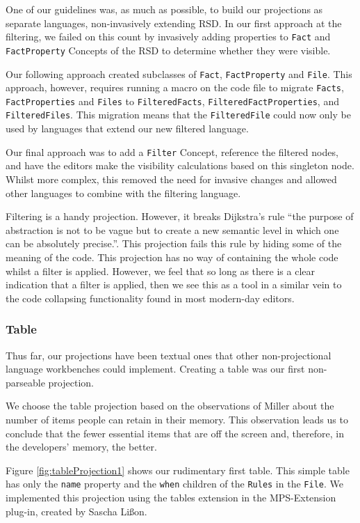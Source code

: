 One of our guidelines was, as much as possible, to build our projections as separate languages, non-invasively extending RSD.
In our first approach at the filtering, we failed on this count by invasively adding properties to \texttt{Fact} and \texttt{FactProperty} Concepts of the RSD to determine whether they were visible.

Our following approach created subclasses of \texttt{Fact}, \texttt{FactProperty} and \texttt{File}.
This approach, however, requires running a macro on the code file to migrate \texttt{Facts}, \texttt{FactProperties} and \texttt{Files} to \texttt{FilteredFacts}, \texttt{FilteredFactProperties}, and \texttt{FilteredFiles}.
This migration means that the \texttt{FilteredFile} could now only be used by languages that extend our new filtered language.

Our final approach was to add a \texttt{Filter} Concept, reference the filtered nodes, and have the editors make the visibility calculations based on this singleton node.
Whilst more complex, this removed the need for invasive changes and allowed other languages to combine with the filtering language.

Filtering is a handy projection.
However, it breaks Dijkstra's rule ``the purpose of abstraction is not to be vague but to create a new semantic level in which one can be absolutely precise.''\cite{dijkstra1972humble}.
This projection fails this rule by hiding some of the meaning of the code.
This projection has no way of containing the whole code whilst a filter is applied.
However, we feel that so long as there is a clear indication that a filter is applied, then we see this as a tool in a similar vein to the code collapsing functionality found in most modern-day editors.

\subsubsection{Table}
Thus far, our projections have been textual ones that other non-projectional language workbenches could implement.
Creating a table was our first non-parseable projection.

We choose the table projection based on the observations of Miller\cite{miller1956magical} about the number of items people can retain in their memory.
This observation leads us to conclude that the fewer essential items that are off the screen and, therefore, in the developers' memory, the better.

Figure \ref{fig:tableProjection1} shows our rudimentary first table.
This simple table has only the \texttt{name} property and the \texttt{when} children of the \texttt{Rules} in the \texttt{File}.
We implemented this projection using the tables extension in the MPS-Extension plug-in, created by Sascha Lißon.

